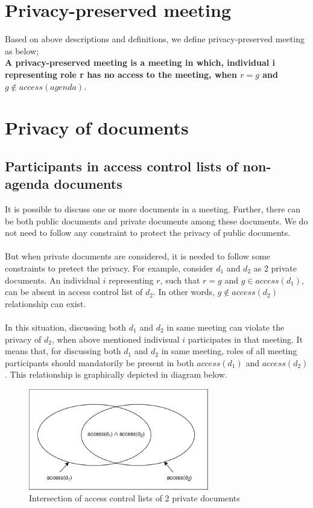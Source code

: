 \documentclass{article}
\begin{document}
\section{Privacy-preserved meeting}
Based on above descriptions and definitions, we define privacy-preserved meeting as below;\\
\textbf{A privacy-preserved meeting is a meeting in which, individual i representing role r has no access to the meeting, when $r = g$ and $g \notin access(agenda)$}.


\section{Privacy of documents}
\subsection{Participants in access control lists of non-agenda documents}
\noindent
It is possible to discuss one or more documents in a meeting. Further, there can be both public documents and private documents among these documents. We do not need to follow any constraint to protect the privacy of public documents.\\ \\
But when private documents are considered, it is needed to follow some constraints to pretect the privacy. For example, consider $d_{1}$ and $d_{2}$ as 2 private documents. An individual $i$ representing $r$, such that $r = g$ and $g \in access(d_{1})$, can be absent in access control list of $d_{2}$. In other words, $g \notin access(d_{2})$ relationship can exist.\\ \\
In this situation, discussing both $d_{1}$ and $d_{2}$ in same meeting can violate the privacy of $d_{2}$, when above mentioned indivisual $i$ participates in that meeting. It means that, for discussing both $d_{1}$ and $d_{2}$ in same meeting, roles of all meeting participants should mandatorily be present in both $access(d_{1})$ and $access(d_{2})$. This relationship is graphically depicted in diagram below.
\begin{figure}[H]
    \centering
    \includegraphics[width=0.7\textwidth]{./image/d1_intersection_d2.png}
    \caption{Intersection of access control lists of 2 private documents}
    \label{fig:sample}
\end{figure} 
\end{document}
